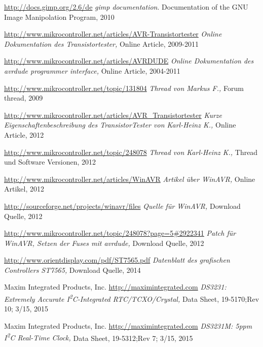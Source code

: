 \documentclass[pdftex,12pt,a4paper,oneside,english]{report}
\begin{document}
\begin{thebibliography}{99}
\url{http://docs.gimp.org/2.6/de}
\emph{gimp documentation}.
Documentation of the GNU Image Manipolation Program,
2010

\url{http://www.mikrocontroller.net/articles/AVR-Transistortester}
\emph{Online Dokumentation des Transistortester,}
Online Article,
2009-2011

\url{http://www.mikrocontroller.net/articles/AVRDUDE}
\emph{Online Dokumentation des avrdude programmer interface,}
Online Article,
2004-2011

\url{http://www.mikrocontroller.net/topic/131804}
\emph{Thread von Markus F.,}
Forum thread, 
2009

\url{http://www.mikrocontroller.net/articles/AVR\_Transistortester}
\emph{Kurze Eigenschaftenbeschreibung des TransistorTester von Karl-Heinz K.,}
Online Article,
2012

\url{http://www.mikrocontroller.net/topic/248078}
\emph{Thread von Karl-Heinz K.,}
Thread und Software Versionen,
2012

\url{http://www.mikrocontroller.net/articles/WinAVR}
\emph{Artikel über WinAVR,}
Online Artikel,
2012

\url{http://sourceforge.net/projects/winavr/files}
\emph{Quelle für WinAVR,}
Download Quelle,
2012

\url{http://www.mikrocontroller.net/topic/248078?page=5#2922341}
\emph{Patch für WinAVR, Setzen der Fuses mit avrdude,}
Download Quelle,
2012

\url{http://www.orientdisplay.com/pdf/ST7565.pdf}
\emph{Datenblatt des grafischen Controllers ST7565,}
Download Quelle,
2014

Maxim Integrated Products, Inc.
\url{http://maximintegrated.com}
\emph{DS3231: Extremely Accurate I\textsuperscript{2}C-Integrated RTC/TCXO/Crystal,}
Data Sheet,
19-5170;Rev 10; 3/15,
2015

Maxim Integrated Products, Inc.
\url{http://maximintegrated.com}
\emph{DS3231M: 5ppm I\textsuperscript{2}C Real-Time Clock,}
Data Sheet,
19-5312;Rev 7; 3/15,
2015


\end{thebibliography}
\end{document}
